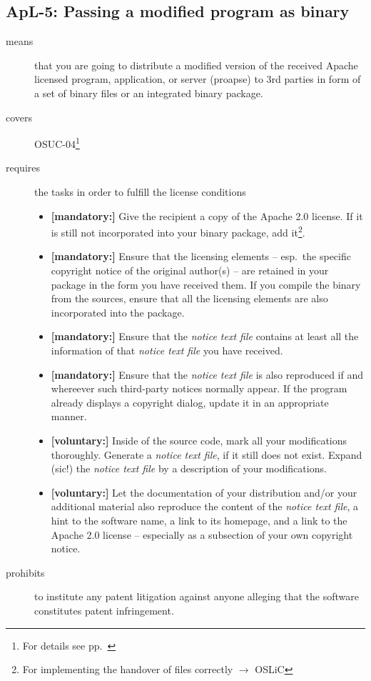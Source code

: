 \subsection{ApL-5: Passing a modified program as binary}

\begin{description}
\item[means] that you are going to distribute a modified version of the received
Apache licensed pro\-gram, application, or server (proapse) to 3rd parties in
form of a set of binary files or an integrated binary package.
\item[covers] OSUC-04\footnote{For details see pp.\ \pageref{OSUC-04-DEF}}
\item[requires] the tasks in order to fulfill the license conditions
\begin{itemize}

 \item \textbf{[mandatory:]} Give the recipient a copy of the Apache 2.0
  license. If it is still not incorporated into your binary package, add
  it\footnote{For implementing the handover of files correctly $\rightarrow$
  OSLiC \pageref{DistributingFilesHint}}.
  
  \item \textbf{[mandatory:]} Ensure that the licensing elements -- esp.\ the
  specific copyright notice of the original author(s) -- are retained in your
  package in the form you have received them. If you compile the binary from the
  sources, ensure that all the licensing elements are also incorporated into the
  package.
  
  \item \textbf{[mandatory:]} Ensure that the \emph{notice text file} contains at least
  all the information of that \emph{notice text file} you have received.
  
  \item \textbf{[mandatory:]} Ensure that the \emph{notice text file} is also
  reproduced if and whereever such third-party notices normally appear. If the
  program already displays a copyright dialog, update it in an appropriate
  manner.
 
  \item \textbf{[voluntary:]} Inside of the source code, mark all your
  modifications thoroughly. Generate a \emph{notice text file}, if it still does not
  exist. Expand (sic!) the \emph{notice text file} by a description of your
  modifications.
 
  \item \textbf{[voluntary:]} Let the documentation of your distribution and/or
  your additional material also reproduce the content of the \emph{notice text
  file}, a hint to the software name, a link to its homepage, and a link to the
  Apache 2.0 license -- especially as a subsection of your own copyright notice.

\end{itemize}

\item[prohibits] to institute any patent litigation against anyone alleging that
the software constitutes patent infringement.

\end{description}

